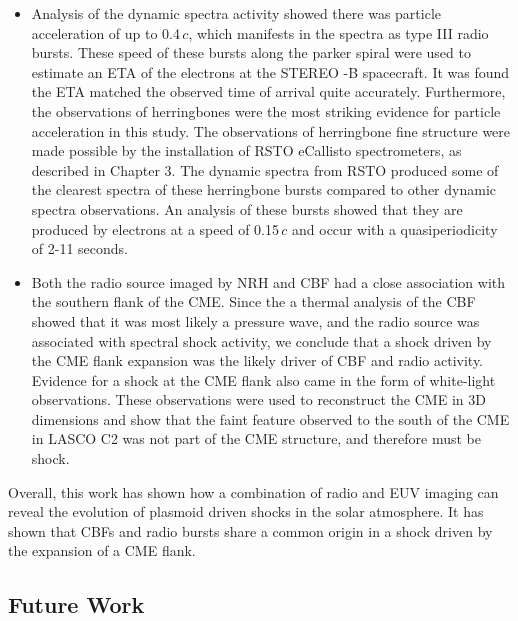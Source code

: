 \begin{itemize}
\item Analysis of the dynamic spectra activity showed there was particle acceleration of up to 0.4\,$c$, which manifests in the spectra as type III radio bursts. These speed of these bursts along the parker spiral were used to estimate an ETA of the electrons at the STEREO -B spacecraft. It was found the ETA matched the observed time of arrival quite accurately. Furthermore, the observations of herringbones were the most striking evidence for particle acceleration in this study. The observations of herringbone fine structure were made possible by the installation of RSTO eCallisto spectrometers, as described in Chapter 3. The dynamic spectra from RSTO produced some of the clearest spectra of these herringbone bursts compared to other dynamic spectra observations. An analysis of these bursts showed that they are produced by electrons at a speed of 0.15\,$c$ and occur with a quasiperiodicity of 2-11 seconds.
\item Both the radio source imaged by NRH and CBF had a close association with the southern flank of the CME. Since the a thermal analysis of the CBF showed that it was most likely a pressure wave, and the radio source was associated with spectral shock activity, we conclude that a shock driven by the CME flank expansion was the likely driver of CBF and radio activity. Evidence for a shock at the CME flank also came in the form of white-light observations. These observations were used to reconstruct the CME in 3D dimensions and show that the faint feature observed to the south of the CME in LASCO C2 was not part of the CME structure, and therefore must be shock.
\end{itemize}
Overall, this work has shown how a combination of radio and EUV imaging can reveal the evolution of plasmoid driven shocks in the solar atmosphere. It has shown that CBFs and radio bursts share a common origin in a shock driven by the expansion of a CME flank.

\subsection{Future Work}

